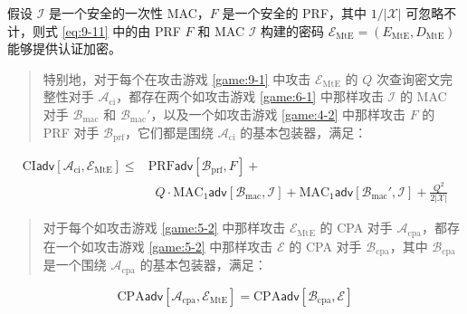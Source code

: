 \begin{theorem}\label{theo:9-3}
假设 $\mathcal{I}$ 是一个安全的一次性 MAC，$F$ 是一个安全的 PRF，其中 $1/|\mathcal{X}|$ 可忽略不计，则式 \ref{eq:9-11} 中的由 PRF $F$ 和 MAC $\mathcal{I}$ 构建的密码 $\mathcal{E}_\mathrm{MtE}=(E_\mathrm{MtE},D_\mathrm{MtE})$ 能够提供认证加密。
\begin{quote}
特别地，对于每个在攻击游戏 \ref{game:9-1} 中攻击 $\mathcal{E}_\mathrm{MtE}$ 的 $Q$ 次查询密文完整性对手 $\mathcal{A}_\mathrm{ci}$，都存在两个如攻击游戏 \ref{game:6-1} 中那样攻击 $\mathcal{I}$ 的 MAC 对手 $\mathcal{B}_\mathrm{mac}$ 和 $\mathcal{B}_\mathrm{mac}'$，以及一个如攻击游戏 \ref{game:4-2} 中那样攻击 $F$ 的 PRF 对手 $\mathcal{B}_\mathrm{prf}$，它们都是围绕 $\mathcal{A}_\mathrm{ci}$ 的基本包装器，满足：
\end{quote}
\begin{equation}\label{eq:9-12}
\begin{aligned}
\mathrm{CI}\mathsf{adv}[\mathcal{A}_\mathrm{ci},\mathcal{E}_\mathrm{MtE}]
\leq
& \mathrm{PRF}\mathsf{adv}[\mathcal{B}_\mathrm{prf},F]+\\
& \;\; Q\cdot
\mathrm{MAC}_1\mathsf{adv}[\mathcal{B}_\mathrm{mac},\mathcal{I}]+
\mathrm{MAC}_1\mathsf{adv}[\mathcal{B}_\mathrm{mac}',\mathcal{I}]
+\frac{Q^2}{2|\mathcal{X}|}
\end{aligned}
\end{equation}
\begin{quote}
对于每个如攻击游戏 \ref{game:5-2} 中那样攻击 $\mathcal{E}_\mathrm{MtE}$ 的 CPA 对手 $\mathcal{A}_\mathrm{cpa}$，都存在一个如攻击游戏 \ref{game:5-2} 中那样攻击 $\mathcal{E}$ 的 CPA 对手 $\mathcal{B}_\mathrm{cpa}$，其中 $\mathcal{B}_\mathrm{cpa}$ 是一个围绕 $\mathcal{A}_\mathrm{cpa}$ 的基本包装器，满足：
\end{quote}
\[
\mathrm{CPA}\mathsf{adv}[\mathcal{A}_\mathrm{cpa},\mathcal{E}_\mathrm{MtE}]
=
\mathrm{CPA}\mathsf{adv}[\mathcal{B}_\mathrm{cpa},\mathcal{E}]
\]
\end{theorem}

